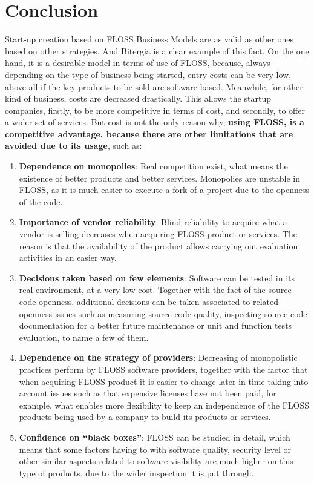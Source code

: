 \documentclass[11pt]{article}
\begin{document}
\section{Conclusion}
Start-up creation based on FLOSS Business Models are as valid as other ones based on other strategies. And Bitergia is a clear example of this fact. On the one hand, it is a desirable model in terms of use of FLOSS, because, always depending on the type of business being started, entry costs can be very low, above all if the key products to be sold are software based. Meanwhile, for other kind of business, costs are decreased drastically. This allows the startup companies, firstly, to be more competitive in terms of cost, and secondly, to offer a wider set of services. But cost is not the only reason why, \textbf{using FLOSS, is a competitive advantage, because there are other limitations that are avoided due to its usage}, such as:
\begin{enumerate}
\item{\textbf{Dependence on monopolies}}: Real competition exist, what means the existence of better products and better services. Monopolies are unstable in FLOSS, as it is much easier to execute a fork of a project due to the openness of the code.
\item{\textbf{Importance of vendor reliability}}:
Blind reliability to acquire what a vendor is selling decreases when acquiring FLOSS product or services. The reason is that the availability of the product allows carrying out evaluation activities in an easier way.
\item{\textbf{Decisions taken based on few elements}}:
Software can be tested in its real environment, at a very low cost. Together with the fact of the source code openness, additional decisions can be taken associated to related openness issues such as measuring source code quality, inspecting source code documentation for a better future maintenance or unit and function tests evaluation, to name a few of them.
\item{\textbf{Dependence on the strategy of providers}}:
Decreasing of monopolistic practices perform by FLOSS software providers, together with the factor that when acquiring FLOSS product it is easier to change later in time taking into account issues such as that expensive licenses have not been paid, for example, what enables more flexibility to keep an independence of the FLOSS products being used by a company to build its products or services.
\item{\textbf{Confidence on “black boxes”}}: FLOSS can be studied in detail, which means that some factors having to with software quality, security level or other similar aspects related to software visibility are much higher on this type of products, due to the wider inspection it is put through.
\end{enumerate}
\end{document}
